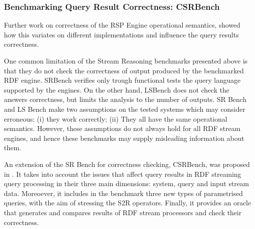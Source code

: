 \subsubsection{Benchmarking Query Result Correctness: CSRBench}

Further work on correctness of the RSP Engine operational semantics, showed how this variates on different implementations and influence the query results correctness. \cite{DBLP:conf/semweb/DellAglioCBCV13}

One common limitation of the Stream Reasoning benchmarks presented above is that they do not check the correctness of output produced by the benchmarked RDF engine. SRBench verifies only trough functional tests the query language supported by the engines. On the other hand, LSBench does not check the answers correctness, but limits the analysis to the number of outputs. 
SR Bench and LS Bench make two assumptions on the tested systems which may consider erroneous: (i) they work correctly; (ii) They all have the same operational semantics. However, these assumptions do not always hold for all RDF stream engines, and hence these benchmarks may supply misleading information about them.
 
An extension of the SR Bench for correctness checking, CSRBench, was proposed in \cite{DBLP:conf/semweb/DellAglioCBCV13}. It takes into account the issues that affect query results in RDF streaming query processing in their three main dimensions: system, query and input stream data. Moreoever, it includes in the benchmark three new types of parametrised queries, with the aim of stressing the S2R operators. Finally, it provides an oracle that generates and compares results of RDF stream processors and check their correctness.